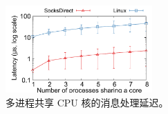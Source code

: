 \begin{figure}[htbp]
	
	\centering \includegraphics[width=0.5\textwidth]{eval/microbenchmark/sharecore-lat.pdf}
	
	\caption{多进程共享 CPU 核的消息处理延迟。}
	\label{socksdirect:fig:eval-context-switch}
\end{figure}

